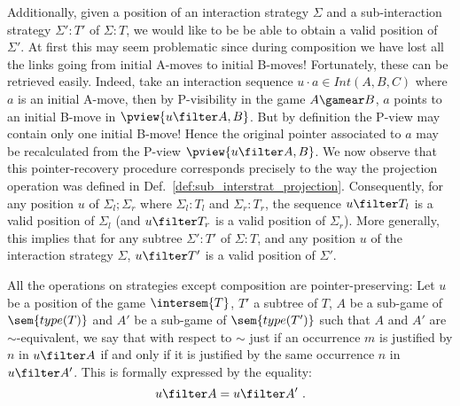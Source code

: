 Additionally, given a position of an interaction strategy $\Sigma$ and a sub-interaction strategy $\Sigma':T'$ of $\Sigma:T$,
we would like to be be able to obtain a valid position of $\Sigma'$.
At first this may seem problematic since during composition we have lost all the links going from initial A-moves to initial B-moves!
Fortunately, these can be retrieved easily. Indeed, take an interaction sequence $u \cdot a \in Int(A,B,C)$ where $a$ is an initial A-move,
then by P-visibility in the game $A\gamear B$, $a$ points to an initial B-move in $\pview{u\filter A,B}$. But by definition the P-view may contain only one initial B-move! Hence the original pointer associated to $a$ may be recalculated from the P-view $\pview{u\filter A,B}$.
We now observe that this pointer-recovery procedure corresponds precisely to the way the projection operation was defined in Def.\ \ref{def:sub_interstrat_projection}. Consequently, for any position $u$ of $\Sigma_l ; \Sigma_r$ where $\Sigma_l:T_l$ and $\Sigma_r:T_r$,
the sequence $u\filter T_l$ is a valid position of $\Sigma_l$ (and $u\filter T_r$ is a valid position of $\Sigma_r$).
More generally, this implies that for any subtree $\Sigma':T'$ of $\Sigma:T$, and any position $u$ of the interaction strategy $\Sigma$,
$u\filter T'$ is a valid position of $\Sigma'$.


All the operations on strategies except composition are pointer-preserving: Let $u$ be a position of the game $\intersem{T}$, $T'$ a subtree of $T$, $A$ be a sub-game of $\sem{type(T)}$ and $A'$ be a sub-game of $\sem{type(T')}$ such that $A$ and $A'$ are $\sim$-equivalent, we say that   with respect to $\sim$ just if an occurrence $m$ is justified by $n$ in $u\filter A$ if and only if it is justified by the same occurrence $n$ in $u \filter A'$. This is formally expressed by the equality:
\begin{equation*}
u\filter A = u\filter A' \ .
\end{equation*}


